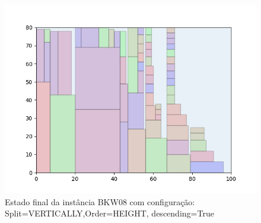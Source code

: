 \begin{figure}[H]
    \centering
    \caption[]{Estado final da instância BKW08 com configuração: Split=VERTICALLY,Order=HEIGHT, descending=True}
    \label{fig:bkw08-vertically-height-true}
    \includegraphics[scale=0.5]{output/figures/bkw/bkw08/vertically/height/true/00}
\end{figure}